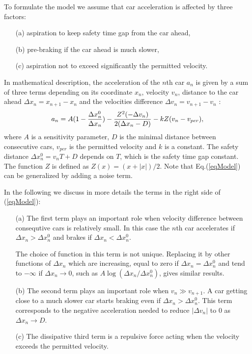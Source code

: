 To formulate the model we assume that car acceleration is affected by three
factors:
 \begin{itemize}
\item[(a)] aspiration to keep safety time gap from the car ahead,
\item[(b)] pre-braking if the car ahead is much slower,
\item[(c)] aspiration not to exceed significantly the permitted velocity.
\end{itemize}
In mathematical description, the acceleration of the $n$th car $a_n$ is
given by a sum of three terms depending on its coordinate $x_n$, velocity
$v_n$, distance to the car ahead $\Delta x_n=x_{n+1}-x_n$ and the
velocities difference $\Delta v_n=v_{n+1}-v_n$ :
\begin{equation}
\label{eqModel} 
a_n = A(1-{{\Delta x_n^0}\over{\Delta x_n}} ) -
{ {Z^2(-\Delta v_n)} \over{2(\Delta x_n - D)} } -
kZ(v_n-v_{per}),
\end{equation}
where $A$ is a sensitivity parameter, $D$ is the minimal
distance between consecutive cars, $v_{per}$ is the permitted
velocity and $k$ is a constant. The safety distance
$\Delta x_n^0=v_nT+D$ depends on $T$, which is the safety time gap
constant. The function $Z$ is defined as $Z(x)=(x+|x|)/2$.
Note that Eq.(\ref{eqModel}) can be generalized by adding a noise term.

In the following we discuss in more details the terms in
the right side of (\ref{eqModel}):

\begin{itemize}
\item[(a)] The first term plays an important role when
velocity difference between consequtive cars is relatively small.
In this case the $n$th car accelerates if $\Delta x_n > \Delta x_n^0$
and brakes if $\Delta x_n < \Delta x_n^0$.

The choice of function in this term is
not unique. Replacing it by other functions of $\Delta x_n$ which
are increasing, equal to zero if $\Delta x_n=\Delta x_n^0$ and tend to
$-\infty$ if $\Delta x_n\to 0$, such as $A\log({ \Delta x_n / \Delta
x_n^0})$, gives similar results.

\item[(b)] The second term plays an important role when $v_n \gg v_{n+1}$.
A car getting close to a much slower car starts braking
even if $\Delta x_n > \Delta x_n^0$. This term corresponds to the negative
acceleration needed to reduce $|\Delta v_n|$ to $0$ as $\Delta x_n\to D$.

\item[(c)] The dissipative third term is a repulsive force
acting when the velocity exceeds the permitted velocity.
\end{itemize}

